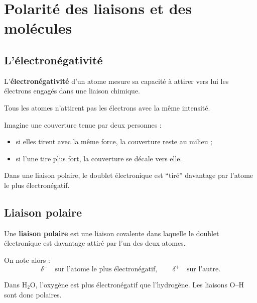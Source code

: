 \documentclass[11pt,a4paper]{article}
\begin{document}
\section{Polarité des liaisons et des molécules}

\subsection{L’électronégativité}

\begin{definitionbox}
L’\textbf{électronégativité} d’un atome mesure sa capacité à attirer vers lui les électrons engagés dans une liaison chimique.
\end{definitionbox}

\begin{ideebox}
Tous les atomes n’attirent pas les électrons avec la même intensité.
\end{ideebox}

\begin{analogebox}
Imagine une couverture tenue par deux personnes :
\begin{itemize}
    \item si elles tirent avec la même force, la couverture reste au milieu ;
    \item si l’une tire plus fort, la couverture se décale vers elle.
\end{itemize}
Dans une liaison polaire, le doublet électronique est ``tiré'' davantage par l’atome le plus électronégatif.
\end{analogebox}

\subsection{Liaison polaire}

\begin{definitionbox}
Une \textbf{liaison polaire} est une liaison covalente dans laquelle le doublet électronique est davantage attiré par l’un des deux atomes.
\end{definitionbox}

On note alors :
\[
\delta^- \quad \text{sur l’atome le plus électronégatif}, \qquad
\delta^+ \quad \text{sur l’autre}.
\]

\begin{exemplebox}
Dans \(\mathrm{H_2O}\), l’oxygène est plus électronégatif que l’hydrogène.  
Les liaisons O--H sont donc polaires.
\end{exemplebox}
\end{document}
